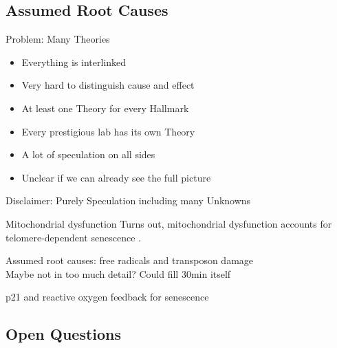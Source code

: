 



\subsection{Assumed Root Causes}

\begin{frame}[c]{Problem: Many Theories}
    \large
    \begin{itemize}[<+(1)->]
        \item Everything is interlinked
        \item Very hard to distinguish cause and effect
        \item At least one Theory for every Hallmark
        \item Every prestigious lab has its own Theory
        \item A lot of speculation on all sides
        \item Unclear if we can already see the full picture
    \end{itemize}
\end{frame}


\addtocounter{framenumber}{1}
\begin{frame}[standout]
    Disclaimer: Purely Speculation including many Unknowns
\end{frame}

\begin{frame}[c]{Mitochondrial dysfunction}
    \large
    Turns out, mitochondrial dysfunction accounts for telomere-dependent senescence \cite{passos2007mitochondrial}.
\end{frame}


\begin{frame}[c]
    \large
    Assumed root causes: free radicals and transposon damage \\
    Maybe not in too much detail? Could fill 30min itself \cite{CorePath13:online} \\
    \pause

    p21 and reactive oxygen feedback for senescence \cite{passos2010feedback}
\end{frame}



\subsection{Open Questions}

